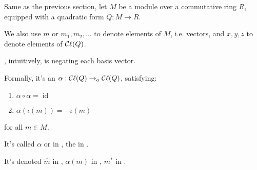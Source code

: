 Same as the previous section, let $M$ be a module over a commutative ring $R$, equipped with a quadratic form $Q: M \to R$.

We also use $m$ or $m_1, m_2, \dots$ to denote elements of $M$, i.e. vectors, and $x, y, z$ to denote elements of $\mathop{\mathcal{C}\ell}(Q)$.

\begin{definition}
    \label{involute}
    \leanok

    , intuitively, is negating each basis vector.

    Formally, it's an  $\alpha : \mathop{\mathcal{C}\ell}(Q) \to_{a} \mathop{\mathcal{C}\ell}(Q)$, satisfying:

    \begin{enumerate}

    \item $\alpha \circ \alpha = \operatorname{id}$
    
    \item $\alpha(\iota(m)) = - \iota(m)$
    
    \end{enumerate}

    for all $m \in M$.

    It's called  $\alpha$ or  in \cite{jadczyk2019notes}, 
    the  in \cite{gallier2008clifford}.

    It's denoted $\hat{m}$ in \cite{lounestoCliffordAlgebrasSpinors2001}, $\alpha(m)$ in \cite{jadczyk2019notes}, $m^*$ in \cite{chisolm2012geometric}.

    \begin{figure}[H]
    \centering
    \end{figure}

\end{definition}

